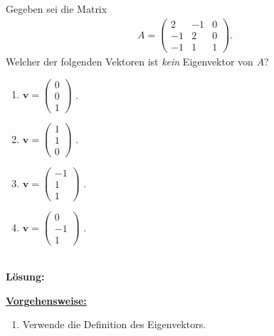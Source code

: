 \newpage

\subsection*{}
Gegeben sei die Matrix
\begin{align*}
	A =
	\begin{pmatrix}
		2 & -1 & 0 \\
		-1 & 2 & 0 \\
		-1 & 1 & 1
	\end{pmatrix}
	.
\end{align*}
Welcher der folgenden Vektoren ist \textit{kein} Eigenvektor von $A$?
\renewcommand{\labelenumi}{(\alph{enumi})}
\begin{enumerate}
	\item 
	$ 
	\mathbf{v}
	=
	\begin{pmatrix}
		0\\ 0 \\ 1
	\end{pmatrix}
	$
	.
	\item 
	$ 
	\mathbf{v}
	=
	\begin{pmatrix}
		1\\ 1 \\ 0
	\end{pmatrix}
	$
	.
	\item
	$ 
	\mathbf{v}
	=
	\begin{pmatrix}
		-1\\ 1 \\ 1
	\end{pmatrix}
	$
	.
	\item
	$ 
	\mathbf{v}
	=
	\begin{pmatrix}
		0\\ -1 \\ 1
	\end{pmatrix}
	$
	.

\end{enumerate}
\ \\
\textbf{Lösung:}
\begin{mdframed}
\underline{\textbf{Vorgehensweise:}}
\renewcommand{\labelenumi}{\theenumi.}
\begin{enumerate}
\item Verwende die Definition des Eigenvektors.
\end{enumerate}
\end{mdframed}

